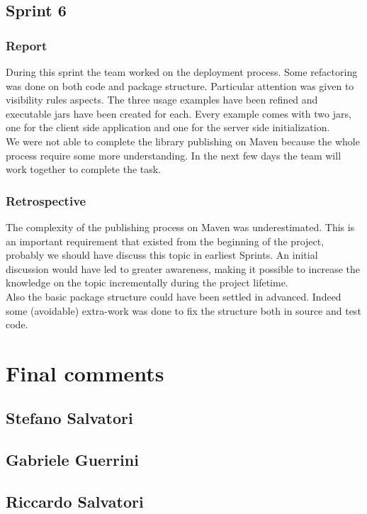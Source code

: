 \subsection{Sprint 6}

\subsubsection{Report}

During this sprint the team worked on the deployment process. Some refactoring was done on both code and package structure. Particular attention was given to visibility rules aspects.
The three usage examples have been refined and executable jars have been created for each. Every example comes with two jars, one for the client side application and one for the server side initialization.
\\
We were not able to complete the library publishing on Maven because the whole process require some more understanding.
In the next few days the team will work together to complete the task.



\subsubsection{Retrospective}


The complexity of the publishing process on Maven was underestimated.
This is an important requirement that existed from the beginning of the project, probably we should have discuss this topic in earliest Sprints. 
An initial discussion would have led to greater awareness, making it possible to increase the knowledge on the topic incrementally during the project lifetime.
\\
Also the basic package structure could have been settled in advanced. 
Indeed some (avoidable) extra-work was done to fix the structure both in source and test code.

\section{Final comments}
\subsection{Stefano Salvatori}
\subsection{Gabriele Guerrini}
\subsection{Riccardo Salvatori}